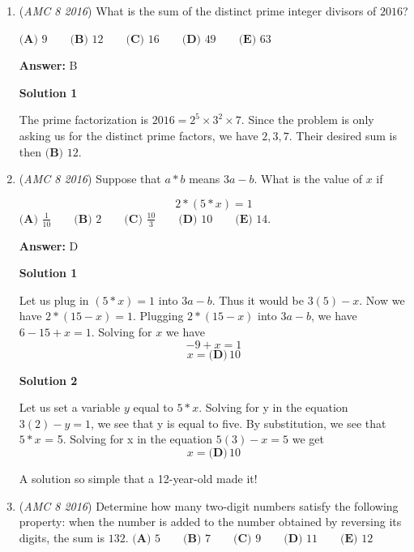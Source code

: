 \begin{enumerate}
\textbf{Solution 4}

Start at 100 then you subtract -98 then add +96 so you just subtract -2, you do this 25 times and get $\boxed{\textbf{(C) }50}$~Aarnavisthebest

 A solution so simple a 12-year-old made it!

 


 


	\item (\textit{AMC 8 2016}) What is the sum of the distinct prime integer divisors of $2016$?


 $\textbf{(A) }9\qquad\textbf{(B) }12\qquad\textbf{(C) }16\qquad\textbf{(D) }49\qquad \textbf{(E) }63$

 \textbf{Answer: }B



\textbf{Solution 1}

The prime factorization is $2016=2^5\times3^2\times7$.  Since the problem is only asking us for the distinct prime factors, we have $2,3,7$.  Their desired sum is then $\boxed{\textbf{(B) }12}$.

 


	\item (\textit{AMC 8 2016}) Suppose that $a * b$ means $3a-b.$ What is the value of $x$ if

 \[2 * (5 * x)=1\]
$\textbf{(A) }\frac{1}{10} \qquad\textbf{(B) }2\qquad\textbf{(C) }\frac{10}{3} \qquad\textbf{(D) }10\qquad \textbf{(E) }14.$

 \textbf{Answer: }D



\textbf{Solution 1}

Let us plug in $(5 * x)=1$ into $3a-b$. Thus it would be $3(5)-x$. Now we have $2*(15-x)=1$. Plugging $2*(15-x)$ into $3a-b$, we have $6-15+x=1$. Solving for $x$ we have 
 \[-9+x=1\]
 \[x=\boxed{\textbf{(D)}   \,        10}\]




\textbf{Solution 2}

Let us set a variable $y$ equal to $5 * x$. Solving for y in the equation $3(2)-y=1$, we see that y is equal to five. By substitution, we see that $5 * x$ = 5. Solving for x in the equation $5(3)-x = 5$ we get 
 \[x=\boxed{\textbf{(D)}   \,        10}\]

 A solution so simple that a 12-year-old made it!

 


	\item (\textit{AMC 8 2016}) Determine how many two-digit numbers satisfy the following property: when the number is added to the number obtained by reversing its digits, the sum is $132.$
$\textbf{(A) }5\qquad\textbf{(B) }7\qquad\textbf{(C) }9\qquad\textbf{(D) }11\qquad \textbf{(E) }12$


\end{enumerate}
